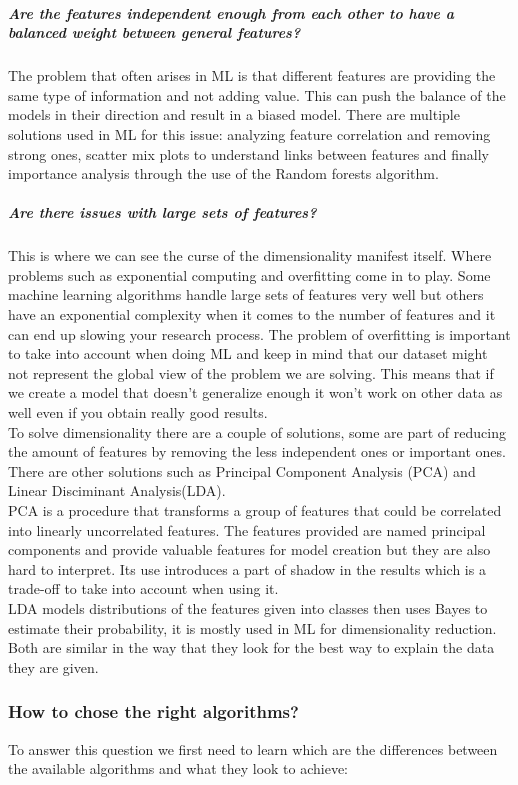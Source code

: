 \subparagraph{Are the features independent enough from each other to have a balanced weight between general features?} The problem that often arises in ML is that different features are providing the same type of information and not adding value. This can push the balance of the models in their direction and result in a biased model. There are multiple solutions used in ML for this issue:  analyzing feature correlation and removing strong ones, scatter mix plots to understand links between features and finally importance analysis through the use of the Random forests algorithm.
\\
\subparagraph{Are there issues with large sets of features?}
This is where we can see the curse of the dimensionality manifest itself. Where problems such as exponential computing and overfitting come in to play. Some machine learning algorithms handle large sets of features very well but others have an exponential complexity when it comes to the number of features and it can end up slowing your research process. The problem of overfitting is important to take into account when doing ML and keep in mind that our dataset might not represent the global view of the problem we are solving. This means that if we create a model that doesn't generalize enough it won't work on other data as well even if you obtain really good results.\\
To solve dimensionality there are a couple of solutions, some are part of reducing the amount of features by removing the less independent ones or important ones. There are other solutions such as Principal Component Analysis (PCA) and Linear Disciminant Analysis(LDA)\cite{ml-reduction}. \\
PCA is a procedure that transforms a group of features that could be correlated into linearly uncorrelated features. The features provided are named principal components and provide valuable features for model creation but they are also hard to interpret. Its use introduces a part of shadow in the results which is a trade-off to take into account when using it. \\
LDA models distributions of the features given into classes then uses Bayes to estimate their probability, it is mostly used in ML for dimensionality reduction.\\
Both are similar in the way that they look for the best way to explain the data they are given.
\\
\subsubsection{How to chose the right algorithms?}
To answer this question we first need to learn which are the differences between the available algorithms and what they look to achieve: 


